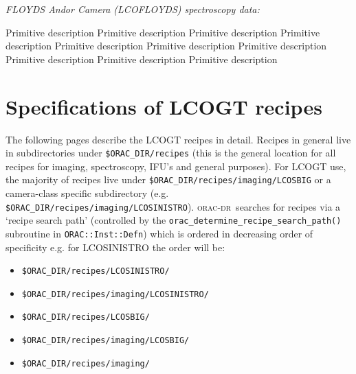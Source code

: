 \documentclass[twoside,11pt,nolof]{starlink}
\providecommand{\oracdr}{\textsc{orac-dr}}
\begin{document}
\begin{small}
{\large
\begin{center}
{\it FLOYDS Andor Camera (LCOFLOYDS) spectroscopy data:}
\end{center}
}

\begin{description}
Primitive description
Primitive description
Primitive description
Primitive description
Primitive description
Primitive description
Primitive description
Primitive description
Primitive description
Primitive description
\end{description}


\end{small}

\newpage

\section{Specifications of LCOGT recipes\label{ap:full_recipes}}

The following pages describe the LCOGT recipes in detail. Recipes in
general live in subdirectories under \verb+$ORAC_DIR/recipes+ (this is the
general location for all recipes for imaging, spectroscopy, IFU's and general
purposes). For LCOGT use, the majority of recipes live under
\verb+$ORAC_DIR/recipes/imaging/LCOSBIG+ or a camera-class specific
subdirectory (e.g. \verb+$ORAC_DIR/recipes/imaging/LCOSINISTRO+). \oracdr\ 
searches for recipes via a `recipe search path' (controlled by the
\verb+orac_determine_recipe_search_path()+ subroutine in
\verb+ORAC::Inst::Defn+) which is ordered in
decreasing order of specificity e.g. for \textsc{LCOSINISTRO} the order will be:
\begin{itemize}
\item \verb+$ORAC_DIR/recipes/LCOSINISTRO/+
\item \verb+$ORAC_DIR/recipes/imaging/LCOSINISTRO/+
\item \verb+$ORAC_DIR/recipes/LCOSBIG/+
\item \verb+$ORAC_DIR/recipes/imaging/LCOSBIG/+
\item \verb+$ORAC_DIR/recipes/imaging/+
\end{itemize}
\end{document}
